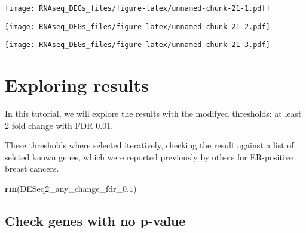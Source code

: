 \documentclass[]{book}
\newenvironment{Shaded}{\begin{snugshade}}{\end{snugshade}}
\newcommand{\KeywordTok}[1]{\textcolor[rgb]{0.13,0.29,0.53}{\textbf{#1}}}
\newcommand{\DataTypeTok}[1]{\textcolor[rgb]{0.13,0.29,0.53}{#1}}
\newcommand{\DecValTok}[1]{\textcolor[rgb]{0.00,0.00,0.81}{#1}}
\newcommand{\FloatTok}[1]{\textcolor[rgb]{0.00,0.00,0.81}{#1}}
\newcommand{\StringTok}[1]{\textcolor[rgb]{0.31,0.60,0.02}{#1}}
\newcommand{\OperatorTok}[1]{\textcolor[rgb]{0.81,0.36,0.00}{\textbf{#1}}}
\newcommand{\NormalTok}[1]{#1}
\begin{document}
\texttt{[image: RNAseq\_DEGs\_files/figure-latex/unnamed-chunk-21-1.pdf]}

\begin{Shaded}
\end{Shaded}

\texttt{[image: RNAseq\_DEGs\_files/figure-latex/unnamed-chunk-21-2.pdf]}

\begin{Shaded}
\end{Shaded}

\texttt{[image: RNAseq\_DEGs\_files/figure-latex/unnamed-chunk-21-3.pdf]}

\section{Exploring results}\label{exploring-results}

In this tutorial, we will explore the results with the modifyed
thresholds: at least 2 fold change with FDR 0.01.

These thresholds where selected iteratively, checking the result against
a list of selcted known genes, which were reported previously by others
for ER-positive breast cancers.

\begin{Shaded}
\begin{Highlighting}[]
\KeywordTok{rm}\NormalTok{(DESeq2_any_change_fdr_}\FloatTok{0.1}\NormalTok{)}
\end{Highlighting}
\end{Shaded}

\subsection{Check genes with no
p-value}\label{check-genes-with-no-p-value}
\end{document}
